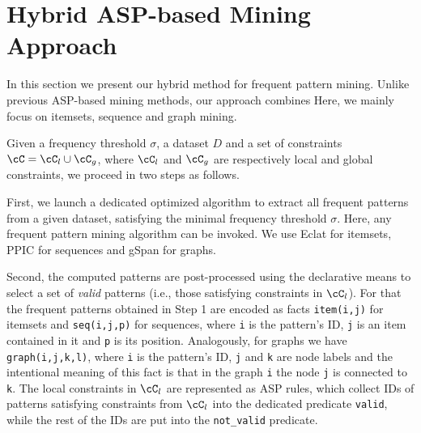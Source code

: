 \section{Hybrid ASP-based Mining Approach}\label{sec:problem}

In this section we present our hybrid method for frequent pattern mining. Unlike previous ASP-based mining methods, our approach combines  Here, we mainly focus on itemsets, sequence and graph mining. 

Given a frequency threshold $\sigma$, a dataset $D$ and a set of constraints $\cC=\cC_l\cup\cC_g$, where $\cC_l$ and $\cC_g$ are respectively local and global constraints, we proceed in two steps as follows. 
\bigskip

 First, we launch a dedicated optimized algorithm to extract all frequent patterns from a given dataset, satisfying the minimal frequency threshold $\sigma$. Here, any frequent pattern mining algorithm can be invoked. %
We use Eclat \parencite{eclat} for itemsets, PPIC \parencite{PPIC} for sequences and gSpan \parencite{gspan} for graphs.
\bigskip

 Second, the computed patterns are post-processed using the declarative means to select a set of \emph{valid} patterns (i.e., those satisfying constraints in $\cC_l$). For that the frequent patterns obtained in Step 1 are encoded as facts \texttt{item(i,j)} for itemsets and \texttt{seq(i,j,p)} for sequences, where \texttt{i} is the pattern's ID, \texttt{j} is an item contained in it and \texttt{p} is its position. Analogously, for graphs we have \texttt{graph(i,j,k,l)}, where \texttt{i} is the pattern's ID, \texttt{j} and \texttt{k} are node labels and the intentional meaning of this fact is that in the graph \texttt{i} the node \texttt{j} is connected to \texttt{k}. The local constraints in $\cC_l$ are represented as ASP rules, which collect IDs of patterns satisfying constraints from $\cC_l$ into the dedicated predicate \texttt{valid}, while the rest of the IDs are put into the \texttt{not\_valid} predicate. 

